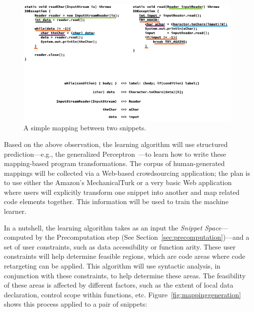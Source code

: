 \begin{figure}[!ht]
    \centering
    \includegraphics[width=\textwidth]{images/mappings}
    \caption{A simple mapping between two snippets.}
    \label{fig:mappings}
\end{figure}

Based on the above observation, the learning algorithm will use structured prediction---e.g., the generalized Perceptron~\cite{Collins:2002uo}---to learn how to write these mapping-based program transformations. The corpus of human-generated mappings will be collected via a Web-based crowdsourcing application; the plan is to use either the Amazon's MechanicalTurk or a very basic Web application where users will explicitly transform one snippet into another and map related code elements together. This information will be used to train the machine learner.

In a nutshell, the learning algorithm takes as an input the \emph{Snippet Space}---computed by the Precomputation step (See Section~\ref{sec:precomputation})---and a set of user constraints, such as data accessibility or function arity. These user constraints will help determine feasible regions, which are code areas where code retargeting can be applied. This algorithm will use syntactic analysis, in conjunction with these constraints, to help determine these areas. The feasibility of these areas is affected by different factors, such as the extent of local data declaration, control scope within functions, etc. Figure~\ref{fig:mappinggeneration} shows this process applied to a pair of snippets:

